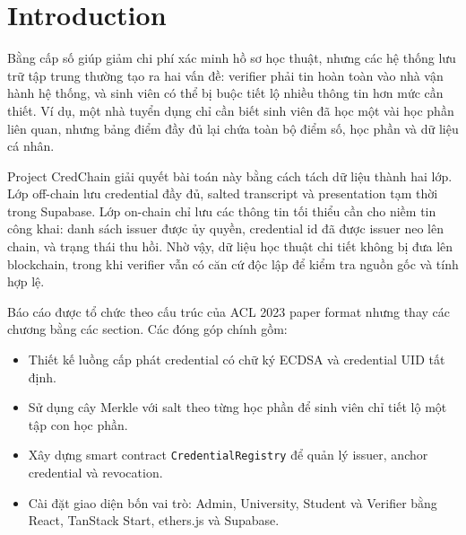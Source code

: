 \section{Introduction}

Bằng cấp số giúp giảm chi phí xác minh hồ sơ học thuật, nhưng các hệ thống lưu trữ tập trung thường tạo ra hai vấn đề: verifier phải tin hoàn toàn vào nhà vận hành hệ thống, và sinh viên có thể bị buộc tiết lộ nhiều thông tin hơn mức cần thiết. Ví dụ, một nhà tuyển dụng chỉ cần biết sinh viên đã học một vài học phần liên quan, nhưng bảng điểm đầy đủ lại chứa toàn bộ điểm số, học phần và dữ liệu cá nhân.

Project CredChain giải quyết bài toán này bằng cách tách dữ liệu thành hai lớp. Lớp off-chain lưu credential đầy đủ, salted transcript và presentation tạm thời trong Supabase. Lớp on-chain chỉ lưu các thông tin tối thiểu cần cho niềm tin công khai: danh sách issuer được ủy quyền, credential id đã được issuer neo lên chain, và trạng thái thu hồi. Nhờ vậy, dữ liệu học thuật chi tiết không bị đưa lên blockchain, trong khi verifier vẫn có căn cứ độc lập để kiểm tra nguồn gốc và tính hợp lệ.

Báo cáo được tổ chức theo cấu trúc của ACL 2023 paper format nhưng thay các chương bằng các section. Các đóng góp chính gồm:
\begin{itemize}[leftmargin=*]
  \item Thiết kế luồng cấp phát credential có chữ ký ECDSA và credential UID tất định.
  \item Sử dụng cây Merkle với salt theo từng học phần để sinh viên chỉ tiết lộ một tập con học phần.
  \item Xây dựng smart contract \texttt{CredentialRegistry} để quản lý issuer, anchor credential và revocation.
  \item Cài đặt giao diện bốn vai trò: Admin, University, Student và Verifier bằng React, TanStack Start, ethers.js và Supabase.
\end{itemize}
